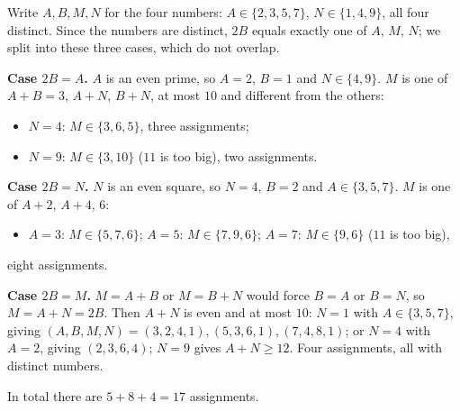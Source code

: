 Write $A,B,M,N$ for the four numbers: $A\in\{2,3,5,7\}$, $N\in\{1,4,9\}$, all four distinct. Since the numbers are distinct, $2B$ equals exactly one of $A$, $M$, $N$; we split into these three cases, which do not overlap.

\textbf{Case $2B=A$.} $A$ is an even prime, so $A=2$, $B=1$ and $N\in\{4,9\}$. $M$ is one of $A+B=3$, $A+N$, $B+N$, at most $10$ and different from the others:
\begin{itemize}
\item $N=4$: $M\in\{3,6,5\}$, three assignments;
\item $N=9$: $M\in\{3,10\}$ ($11$ is too big), two assignments.
\end{itemize}
\textbf{Case $2B=N$.} $N$ is an even square, so $N=4$, $B=2$ and $A\in\{3,5,7\}$. $M$ is one of $A+2$, $A+4$, $6$:
\begin{itemize}
\item $A=3$: $M\in\{5,7,6\}$; $A=5$: $M\in\{7,9,6\}$; $A=7$: $M\in\{9,6\}$ ($11$ is too big),
\end{itemize}
eight assignments.

\textbf{Case $2B=M$.} $M=A+B$ or $M=B+N$ would force $B=A$ or $B=N$, so $M=A+N=2B$. Then $A+N$ is even and at most $10$: $N=1$ with $A\in\{3,5,7\}$, giving $(A,B,M,N)=(3,2,4,1),(5,3,6,1),(7,4,8,1)$; or $N=4$ with $A=2$, giving $(2,3,6,4)$; $N=9$ gives $A+N\ge12$. Four assignments, all with distinct numbers.

In total there are $5+8+4=\boxed{17}$ assignments.

